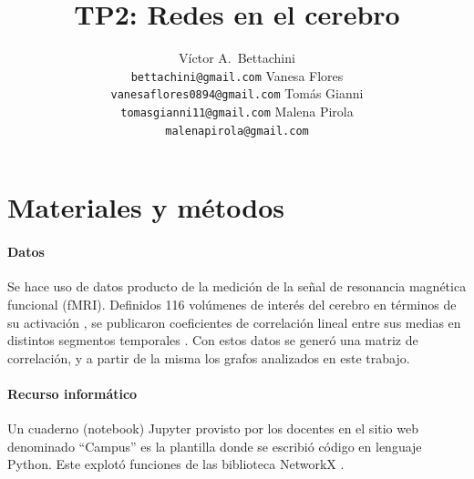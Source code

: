 \documentclass{article}
\title{TP2: Redes en el cerebro}
\author{
  Víctor A.~Bettachini\\
  \texttt{bettachini@gmail.com}
  \And Vanesa Flores\\
  \texttt{vanesaflores0894@gmail.com}
  \And Tomás Gianni\\
  \texttt{tomasgianni11@gmail.com}
  \And Malena Pirola\\
  \texttt{malenapirola@gmail.com}\\
}
\begin{document}
\maketitle







\section{Materiales y métodos}

\paragraph{Datos}
Se hace uso de datos producto de la medición de la señal de resonancia magnética funcional (fMRI).
Definidos 116 volúmenes de interés del cerebro en términos de su activación \cite{tzourio-mazoyer_automated_2002}, se publicaron coeficientes de correlación lineal entre sus medias en distintos segmentos temporales \cite{tagliazucchi_large-scale_2013}.
Con estos datos se generó una matriz de correlación, y a partir de la misma los grafos analizados en este trabajo.


\paragraph{Recurso informático} 
Un cuaderno (notebook) Jupyter provisto por los docentes en el sitio web denominado ``Campus'' \cite{kamienkowski_curso_2023} es la plantilla donde se escribió código en lenguaje Python.
Este explotó funciones de las biblioteca NetworkX \cite{hagberg_exploring_2008}.
\end{document}
